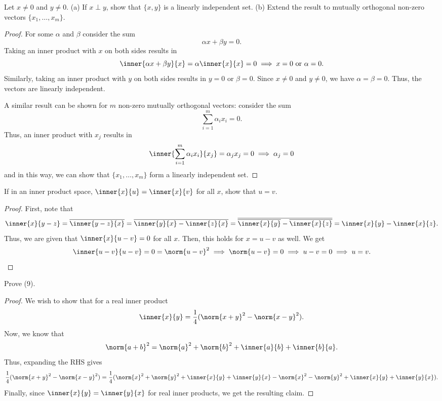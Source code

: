 \begin{question}
    Let $x \neq 0$ and $y \neq 0$. (a) If $x \perp y$, show that $\{x,y\}$ is a linearly independent set. (b) Extend the result to mutually orthogonal non-zero vectors $\{x_1 , \ldots , x_m\}$.
    \label{section3.1-6}
\end{question}
\begin{proof}
    For some $\alpha$ and $\beta$ consider the sum
    \[\alpha x + \beta y = 0.\]
    Taking an inner product with $x$ on both sides results in
    \[\inner{\alpha x + \beta y}{x} = \alpha \inner{x}{x} = 0 \implies x = 0 \text{ or } \alpha = 0.\]
    Similarly, taking an inner product with $y$ on both sides results in $y = 0$ or $\beta = 0$. Since $x \neq 0$ and $y \neq 0$, we have $\alpha = \beta = 0$. Thus, the vectors are linearly independent.

    A similar result can be shown for $m$ non-zero  mutually orthogonal vectors: consider the sum
    \[\sum_{i=1}^m \alpha_i x_i = 0.\]
    Thus, an inner product with $x_j$ results in
    \[\inner{\sum_{i=1}^m \alpha_i x_i}{x_j} = \alpha_j x_j = 0 \implies \alpha_j = 0\]
    and in this way, we can show that $\{x_1 , \ldots , x_m\}$ form a linearly independent set.
\end{proof}

\begin{question}
    If in an inner product space, $\inner{x}{u} = \inner{x}{v}$ for all $x$, show that $u = v$.
    \label{section3.1-7}
\end{question}
\begin{proof}
    First, note that
    \[\inner{x}{y-z} = \overline{\inner{y-z}{x}} = \overline{\inner{y}{x} - \inner{z}{x}} = \overline{\overline{\inner{x}{y}} - \overline{\inner{x}{z}}} = \inner{x}{y} - \inner{x}{z}.\]
    Thus, we are given that $\inner{x}{u-v} = 0$ for all $x$. Then, this holds for $x = u-v$ as well. We get
    \[\inner{u-v}{u-v} = 0 = \norm{u-v}^2 \implies \norm{u-v} = 0 \implies u-v = 0 \implies u = v.\]
    
\end{proof}

\begin{question}
    Prove (9).
    \label{section3.1-8}
\end{question}
\begin{proof}
    We wish to show that for a real inner product
    \[\inner{x}{y} = \frac{1}{4}(\norm{x+y}^2 - \norm{x-y}^2).\]
    Now, we know that
    \[\norm{a+b}^2 = \norm{a}^2 + \norm{b}^2 + \inner{a}{b} + \inner{b}{a}.\]
    Thus, expanding the RHS gives
    \[\frac{1}{4}(\norm{x+y}^2 - \norm{x-y}^2) = \frac{1}{4}(\norm{x}^2 + \norm{y}^2 + \inner{x}{y} + \inner{y}{x} - \norm{x}^2 - \norm{y}^2 + \inner{x}{y} + \inner{y}{x}).\]
    Finally, since $\inner{x}{y} = \inner{y}{x}$ for real inner products, we get the resulting claim.
\end{proof}

